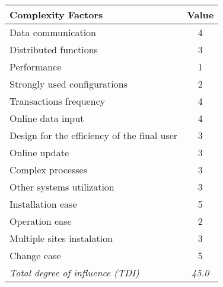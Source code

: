 
\begin{tabular}{l|c}
\textbf{Complexity Factors} & \textbf{Value} \\ \hline
Data communication & 4 \\
Distributed functions & 3 \\
Performance & 1 \\
Strongly used configurations & 2 \\
Transactions frequency & 4 \\
Online data input & 4 \\
Design for the efficiency of the final user & 3 \\
Online update & 3 \\
Complex processes & 3 \\
Other systems utilization & 3 \\
Installation ease & 5 \\
Operation ease & 2 \\
Multiple sites instalation & 3 \\
Change ease & 5 \\ \hline
\textit{Total degree of influence (TDI)} & \textit{45.0}
\end{tabular}
